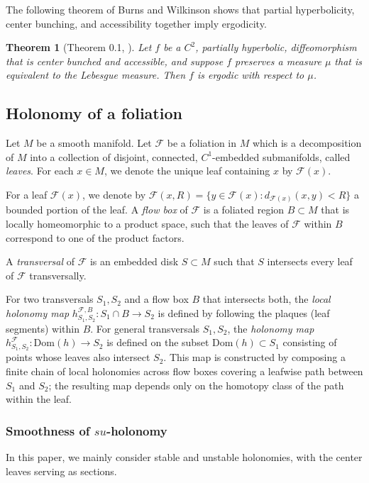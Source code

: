 \documentclass[11pt]{amsart}
\numberwithin{equation}{section}
\theoremstyle{plain}
\newtheorem{thm}{Theorem}[section]
\begin{document}
The following theorem of Burns and Wilkinson \cite{BWerg} shows that partial hyperbolicity, center bunching, and accessibility together imply ergodicity.

\begin{thm}[Theorem 0.1, \cite{BWerg}]\label{accerg}
Let $f$ be a $C^2$, partially hyperbolic,  diffeomorphism that is center bunched and accessible, and suppose $f$ preserves a measure $\mu$ that is equivalent to the Lebesgue measure. Then $f$ is ergodic with respect to $\mu$.
\end{thm}

 \subsection{Holonomy of a foliation}

Let $M$ be a smooth manifold. Let $\mathcal{F}$ be a foliation in $M$ which is a decomposition of $M$ into a collection of disjoint, connected, $C^1$-embedded submanifolds, called \emph{leaves}. For each $x \in M$, we denote the unique leaf containing $x$ by $\mathcal{F}(x)$. 

For a leaf $\mathcal{F}(x)$, we denote by $\mathcal{F}(x,R) = \{ y \in \mathcal{F}(x) : d_{\mathcal{F}(x)}(x,y) < R \}$ a bounded portion of the leaf. A \emph{flow box} of $\mathcal{F}$ is a foliated region $B \subset M$ that is locally homeomorphic to a product space, such that the leaves of $\mathcal{F}$ within $B$ correspond to one of the product factors.

A \emph{transversal} of $\mathcal{F}$ is an embedded disk $S \subset M$ such that $S$ intersects every leaf of $\mathcal{F}$ transversally. 

For two transversals $S_1, S_2$ and a flow box $B$ that intersects both, the \emph{local holonomy map} $h_{S_1, S_2}^{\mathcal{F}, B}: S_1 \cap B \to S_2$ is defined by following the plaques (leaf segments) within $B$. For general transversals $S_1, S_2$, the \emph{holonomy map} $h_{S_1, S_2}^{\mathcal{F}}: \mathrm{Dom}(h) \to S_2$ is defined on the subset $\mathrm{Dom}(h) \subset S_1$ consisting of points whose leaves also intersect $S_2$. This map is constructed by composing a finite chain of local holonomies across flow boxes covering a leafwise path between $S_1$ and $S_2$; the resulting map depends only on the homotopy class of the path within the leaf.


\subsubsection{Smoothness of $su$-holonomy}\label{sec:suhol}
In this paper, we mainly consider stable and unstable holonomies, with the center leaves serving as sections.
\end{document}
